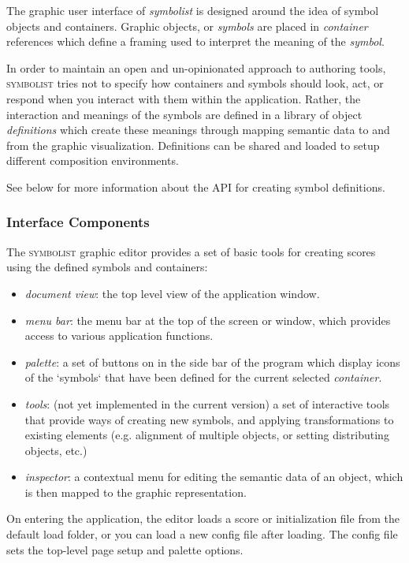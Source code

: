 \documentclass{article}
\def\symbolist{\textsc{symbolist}\xspace}
\begin{document}
The graphic user interface of \textit{symbolist} is designed around the idea of symbol objects and containers. Graphic objects, or \textit{symbols} are placed in \textit{container} references which define a framing used to interpret the meaning of the \textit{symbol}.

In order to maintain an open and un-opinionated approach to authoring tools, \symbolist tries not to specify how containers and symbols should look, act, or respond when you interact with them within the application. Rather, the interaction and meanings of the symbols are defined in a library of object \textit{definitions} which create these meanings through mapping semantic data to and from the graphic visualization. Definitions can be shared and loaded to setup different composition environments.

See below for more information about the API for creating symbol definitions. 

\subsubsection{Interface Components}\label{subsec:interface_components}

The \symbolist graphic editor provides a set of basic tools for creating scores using the defined symbols and containers:
\begin{itemize}\itemsep0pt %
\item \textit{document view}: the top level view of the application window.
\item \textit{menu bar}: the menu bar at the top of the screen or window, which provides access to various application functions.
\item \textit{palette}: a set of buttons on in the side bar of the program which display icons of the `symbols` that have been defined for the current selected \textit{container}. 
\item \textit{tools}: (not yet implemented in the current version) a set of interactive tools that provide ways of creating new symbols, and applying transformations to existing elements (e.g. alignment of multiple objects, or setting distributing objects, etc.)
\item \textit{inspector}: a contextual menu for editing the semantic data of an object, which is then mapped to the graphic representation.
\end{itemize}

On entering the application, the editor loads a score or initialization file from the default load folder, or you can load a new config file after loading. The config file sets the top-level page setup and palette options.
\end{document}
